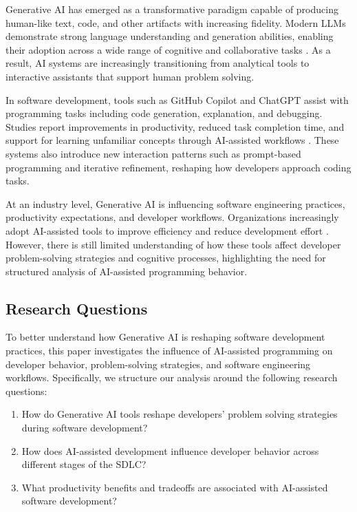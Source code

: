 Generative AI has emerged as a transformative paradigm capable of producing human-like text, code, and other artifacts with increasing fidelity. Modern LLMs demonstrate strong language understanding and generation abilities, enabling their adoption across a wide range of cognitive and collaborative tasks \cite{brown2020gpt3, bommasani2021foundation}. As a result, AI systems are increasingly transitioning from analytical tools to interactive assistants that support human problem solving.

In software development, tools such as GitHub Copilot and ChatGPT assist with programming tasks including code generation, explanation, and debugging. Studies report improvements in productivity, reduced task completion time, and support for learning unfamiliar concepts through AI-assisted workflows \cite{peng2023copilot, vaithilingam2022expectation, kazemitabaar2023copilot}. These systems also introduce new interaction patterns such as prompt-based programming and iterative refinement, reshaping how developers approach coding tasks.

At an industry level, Generative AI is influencing software engineering practices, productivity expectations, and developer workflows. Organizations increasingly adopt AI-assisted tools to improve efficiency and reduce development effort \cite{bird2023copilot, nocode2023industry}. However, there is still limited understanding of how these tools affect developer problem-solving strategies and cognitive processes, highlighting the need for structured analysis of AI-assisted programming behavior.

\subsection{Research Questions}
To better understand how Generative AI is reshaping software development practices, this paper investigates the influence of AI-assisted programming on developer behavior, problem-solving strategies, and software engineering workflows. Specifically, we structure our analysis around the following research questions:
\begin{enumerate}[label=\textbf{RQ \arabic*:},leftmargin=*]
    \item How do Generative AI tools reshape developers' problem solving strategies during software development?
    \item How does AI-assisted development influence developer behavior across different stages of the SDLC?
    \item What productivity benefits and tradeoffs are associated with AI-assisted software development?
\end{enumerate}